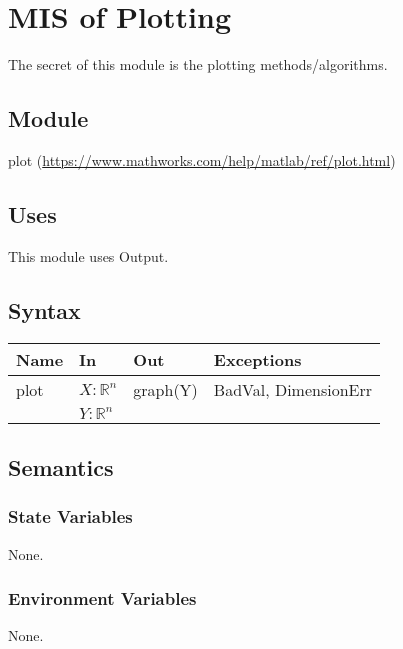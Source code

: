 \documentclass[12pt, titlepage]{article}
\begin{document}
\newpage 

\section{MIS of Plotting} 

The secret of this module is the plotting methods/algorithms. 

\subsection{Module}

plot (\url{https://www.mathworks.com/help/matlab/ref/plot.html})

\subsection{Uses}

This module uses Output. 

\subsection{Syntax}

\begin{center}
	\begin{tabular}{p{2cm} p{6cm} p{6cm} p{3cm}}
		\hline
		\textbf{Name} & \textbf{In} & \textbf{Out} & \textbf{Exceptions} \\
		\hline
		plot & $X : \mathbb{R}^{n}$ & graph(Y) & 
		BadVal, DimensionErr \\ 
		& $Y : \mathbb{R}^{n}$ &  &  \\ 
		\hline
	\end{tabular}
\end{center}

\subsection{Semantics}

\subsubsection{State Variables}

None.

\subsubsection{Environment Variables}

None.
\end{document}
